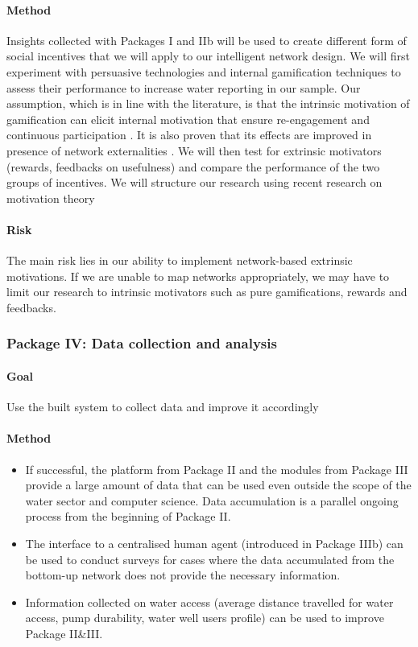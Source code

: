 \documentclass[11pt]{article}
\begin{document}
\paragraph{Method}
Insights collected with Packages I and IIb will be used to create different form of social incentives that we will apply to our intelligent network design. We will first experiment with persuasive technologies \citep{Oinas_Kukkonen2010, fogg2002persuasive} and internal gamification techniques \citep{blaschkeextrinsic, crowley2012gamification} to assess their performance to increase water reporting in our sample. Our assumption, which is in line with the literature, is that the intrinsic motivation of gamification can elicit internal motivation that ensure re-engagement and continuous participation \citep{lin2008elucidating, ling2005using}. It is also proven that its effects are improved in presence of network externalities \citep{lin2011people}. We will then test for extrinsic motivators (rewards, feedbacks on usefulness) and compare the performance of the two groups of incentives. We will structure our research using recent research on motivation theory \citep{davis1992extrinsic, kim2007value}
\paragraph{Risk}
The main risk lies in our ability to implement network-based extrinsic motivations. If we are unable to map networks appropriately, we may have to limit our research to intrinsic motivators such as pure gamifications, rewards and feedbacks. 

\subsubsection*{Package IV: Data collection and analysis}
\paragraph{Goal} Use the built system to collect data and improve it accordingly
\paragraph{Method}

\begin{itemize}
 \item If successful, the platform from Package II and the modules from Package III provide a large amount of data that can be used even outside the scope of the water sector and computer science. Data accumulation is a parallel ongoing process from the beginning of Package II.
 \item The interface to a centralised human agent (introduced in Package IIIb) can be used to conduct surveys for cases where the data accumulated from the bottom-up network does not provide the necessary information.
 
 \item Information collected on water access (average distance travelled for water access, pump durability, water well users profile) can be used to improve Package II\&III.
 
 
\end{itemize}
\end{document}
